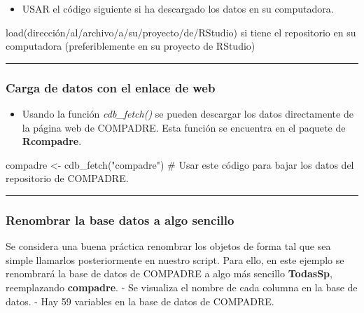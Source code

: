 \documentclass[
  12pt,
  letterpaper,
]{book}
\newenvironment{Shaded}{\begin{snugshade}}{\end{snugshade}}
\newcommand{\CommentTok}[1]{\textcolor[rgb]{0.37,0.37,0.37}{#1}}
\newcommand{\FunctionTok}[1]{\textcolor[rgb]{0.28,0.35,0.67}{#1}}
\newcommand{\NormalTok}[1]{\textcolor[rgb]{0.00,0.23,0.31}{#1}}
\newcommand{\OtherTok}[1]{\textcolor[rgb]{0.00,0.23,0.31}{#1}}
\newcommand{\StringTok}[1]{\textcolor[rgb]{0.13,0.47,0.30}{#1}}
\providecommand{\tightlist}{%
  \setlength{\itemsep}{0pt}\setlength{\parskip}{0pt}}\usepackage{longtable,booktabs,array}
\begin{document}
\begin{itemize}
\tightlist
\item
  USAR el código siguiente si ha descargado los datos en su computadora.
\end{itemize}

load(dirección/al/archivo/a/su/proyecto/de/RStudio) si tiene el
repositorio en su computadora (preferiblemente en su proyecto de
RStudio)

\begin{center}\rule{0.5\linewidth}{0.5pt}\end{center}

\subsubsection{Carga de datos con el enlace de
web}\label{carga-de-datos-con-el-enlace-de-web}

\begin{itemize}
\tightlist
\item
  Usando la función \emph{cdb\_fetch()} se pueden descargar los datos
  directamente de la página web de COMPADRE. Esta función se encuentra
  en el paquete de \textbf{Rcompadre}.
\end{itemize}

\begin{Shaded}
\begin{Highlighting}[]
\NormalTok{compadre }\OtherTok{\textless{}{-}} \FunctionTok{cdb\_fetch}\NormalTok{(}\StringTok{"compadre"}\NormalTok{) }\CommentTok{\# Usar este código para bajar los datos del repositorio de COMPADRE.}
\end{Highlighting}
\end{Shaded}

\begin{center}\rule{0.5\linewidth}{0.5pt}\end{center}

\subsubsection{Renombrar la base datos a algo
sencillo}\label{renombrar-la-base-datos-a-algo-sencillo}

Se considera una buena práctica renombrar los objetos de forma tal que
sea simple llamarlos posteriormente en nuestro script. Para ello, en
este ejemplo se renombrará la base de datos de COMPADRE a algo más
sencillo \textbf{TodasSp}, reemplazando \textbf{compadre}. - Se
visualiza el nombre de cada columna en la base de datos. - Hay 59
variables en la base de datos de COMPADRE.
\end{document}
